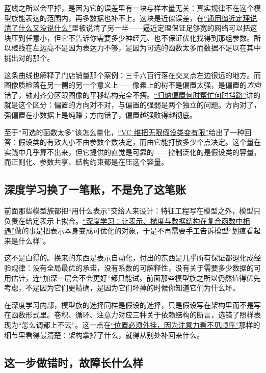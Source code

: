 蓝线之所以会平掉，是因为它的误差里有一块与样本量无关：真实规律不在这个模型族能表达的范围内，再多数据也补不上。这块是近似误差，在\hyperref[sec:14-Deep-Learning/01-Representation-and-Approximation/02]{``通用逼近定理说清了什么又没说什么''}里被说清了另一半——逼近定理保证足够宽的网络可以把这块压到任意小，但它不告诉你需要多少神经元、也不保证优化找得到那组参数。所以橙线在左边高不是因为表达力不够，是因为可选的函数太多而数据不足以在其中挑出对的那个。

这条曲线也解释了门店销量那个案例：三千六百行落在交叉点左边很远的地方。而图像质检落在另一侧的另一个意义上——像素上的树不是偏置太强，是偏置的\emph{方向}错了，轴对齐分区跟图像的平移结构完全不搭。\hyperref[sec:14-Deep-Learning/04-Convolutional-Networks/05]{``归纳偏置何时帮忙何时挡路''}讲的就是这个区分：偏置的方向对不对，与偏置的强弱是两个独立的问题。方向对了，强偏置在小数据上是纯赚；方向错了，偏置越强败得越彻底。

至于``可选的函数太多''该怎么量化，\hyperref[sec:13-Machine-Learning/10-Learning-Theory/03]{``VC 维把无限假设类变有限''}给出了一种回答：假设类的有效大小不由参数个数决定，而由它能打散多少个点决定。这个量在实践中几乎算不出来，但它提供的直觉是可靠的——控制泛化的是假设类的容量，而正则化、参数共享、结构约束都是在压这个容量。

\subsection{深度学习换了一笔账，不是免了这笔账}

前面那些模型族都把``用什么表示''交给人来设计：特征工程写在模型之外，模型只负责在给定表示上拟合。\hyperref[ch:122]{``深度学习：让表示、梯度与数据结构在复合函数中相遇''}做的事是把表示本身变成可优化的对象，于是不再需要手工告诉模型``划痕看起来是什么样''。

这不是白得的。换来的东西是表示自动化，付出的东西是几乎所有保证都退化成经验规律：没有全局最优的承诺，没有系数的可解释性，没有关于需要多少数据的可用估计，连``加深一层会不会更好''都只能试。前面那些模型族之所以仍然值得优先考虑，不是因为它们更精确，是因为它们坏掉的时候你知道它们为什么坏。

在深度学习内部，模型族的选择同样是假设的选择，只是假设写在架构里而不是写在函数形式里。卷积、循环、注意力对应三种关于依赖结构的断言，选错了照样表现为``怎么调都上不去''。这一点在\hyperref[sec:14-Deep-Learning/05-Attention-and-Sequence-Models/03]{``位置必须外挂，因为注意力看不见顺序''}那样的细节里看得最清楚：架构拿掉了什么，就得从别处补回来什么。

\subsection{这一步做错时，故障长什么样}

